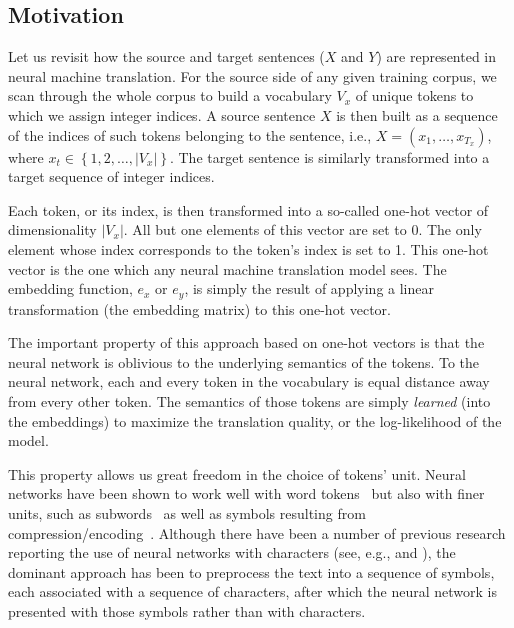 \documentclass[11pt]{article}
\begin{document}
\subsection{Motivation}

Let us revisit how the source and target sentences ($X$ and $Y$) are represented
in neural machine translation. For the source side of any given training corpus,
we scan through the whole corpus to build a vocabulary $V_x$ of unique tokens to
which we assign integer indices.  A source sentence $X$ is then built as a
sequence of the indices of such tokens belonging to the sentence, i.e., $X=(x_1,
\ldots, x_{T_x})$, where $x_t \in \left\{ 1, 2, \ldots, |V_x|\right\}$. The
target sentence is similarly transformed into a target sequence of integer
indices. 

Each token, or its index, is then transformed into a so-called one-hot vector of
dimensionality $|V_x|$.  All but one elements of this vector are set to 0. The
only element whose index corresponds to the token's index is set to 1. This
one-hot vector is the one which any neural machine translation model sees. The
embedding function, $e_x$ or $e_y$, is simply the result of applying a linear transformation
(the embedding matrix) to this one-hot vector.

The important property of this approach based on one-hot vectors is that the
neural network is oblivious to the underlying semantics of the tokens. To the
neural network, each and every token in the vocabulary is equal distance away
from every other token. The semantics of those tokens are simply {\em learned}
(into the embeddings) to maximize the translation quality, or the log-likelihood of the model.

This property allows us great freedom in the choice of tokens' unit. Neural
networks have been shown to work well with word tokens~\cite{bengio2001neural,schwenk2007continuous,mikolov2010recurrent}
but also with finer units, such as
subwords~\cite{sennrich2015neural,botha2014compositional,luong2013better} as well as
symbols resulting from compression/encoding~\cite{chitnis2015variable}. Although
there have been a number of previous research reporting the use of neural
networks with characters (see, e.g.,  and ),
the dominant approach has been to preprocess the text into a sequence of symbols, each associated
with a sequence of characters,
after which the neural network is presented with those symbols rather than
with characters.
\end{document}
